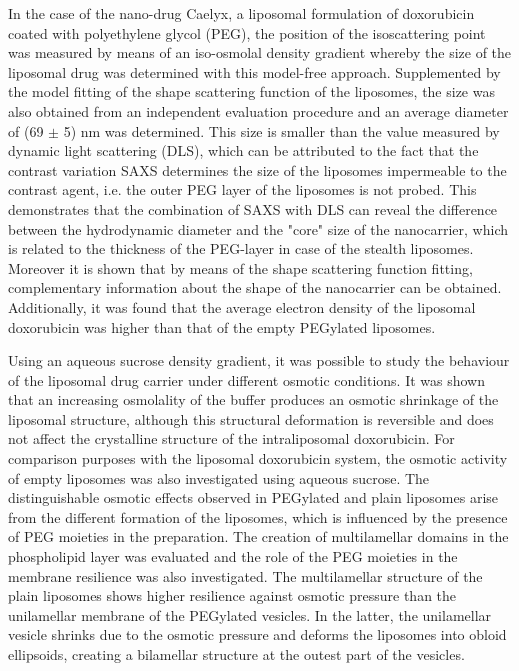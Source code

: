 In the case of the nano-drug Caelyx, a liposomal formulation of doxorubicin coated with polyethylene glycol (PEG), the position of the isoscattering point was measured by means of an iso-osmolal density gradient whereby the size of the liposomal drug was determined with this model-free approach. Supplemented by the model fitting of the shape scattering function of the liposomes, the size was also obtained from an independent evaluation procedure and an average diameter of (69 $\pm$ 5) nm was determined. This size is smaller than the value measured by dynamic light scattering (DLS), which can be attributed to the fact that the contrast variation SAXS determines the size of the liposomes impermeable to the contrast agent, i.e. the outer PEG layer of the liposomes is not probed. This demonstrates that the combination of SAXS with DLS can reveal the difference between the hydrodynamic diameter and the "core" size of the nanocarrier, which is related to the thickness of the PEG-layer in case of the stealth liposomes. Moreover it is shown that by means of the shape scattering function fitting, complementary information about the shape of the nanocarrier can be obtained. Additionally, it was found that the average electron density of the liposomal doxorubicin was higher than that of the empty PEGylated liposomes.

Using an aqueous sucrose density gradient, it was possible to study the behaviour of the liposomal drug carrier under different osmotic conditions. It was shown that an increasing osmolality of the buffer produces an osmotic shrinkage of the liposomal structure, although this structural deformation is reversible and does not affect the crystalline structure of the intraliposomal doxorubicin. For comparison purposes with the liposomal doxorubicin system, the osmotic activity of empty liposomes was also investigated using aqueous sucrose. The distinguishable osmotic effects observed in PEGylated and plain liposomes arise from the different formation of the liposomes, which is influenced by the presence of PEG moieties in the preparation. The creation of multilamellar domains in the phospholipid layer was evaluated and the role of the PEG moieties in the membrane resilience was also investigated. The multilamellar structure of the plain liposomes shows higher resilience against osmotic pressure than the unilamellar membrane of the PEGylated vesicles. In the latter, the unilamellar vesicle shrinks due to the osmotic pressure and deforms the liposomes into obloid ellipsoids, creating a bilamellar structure at the outest part of the vesicles.

